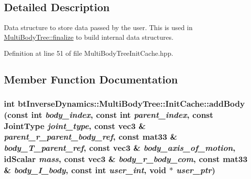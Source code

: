 \subsection{Detailed Description}
Data structure to store data passed by the user. This is used in \hyperlink{classbt_inverse_dynamics_1_1_multi_body_tree_c82772ed5bebb1edd6513c03ebd719c2}{MultiBodyTree::finalize} to build internal data structures. 

Definition at line 51 of file MultiBodyTreeInitCache.hpp.

\subsection{Member Function Documentation}
\hypertarget{classbt_inverse_dynamics_1_1_multi_body_tree_1_1_init_cache_3140b788b6cdc6c5a74cf2da2e8f5fac}{
\subsubsection[addBody]{\setlength{\rightskip}{0pt plus 5cm}int btInverseDynamics::MultiBodyTree::InitCache::addBody (const int {\em body\_\-index}, \/  const int {\em parent\_\-index}, \/  const JointType {\em joint\_\-type}, \/  const {\bf vec3} \& {\em parent\_\-r\_\-parent\_\-body\_\-ref}, \/  const mat33 \& {\em body\_\-T\_\-parent\_\-ref}, \/  const {\bf vec3} \& {\em body\_\-axis\_\-of\_\-motion}, \/  idScalar {\em mass}, \/  const {\bf vec3} \& {\em body\_\-r\_\-body\_\-com}, \/  const mat33 \& {\em body\_\-I\_\-body}, \/  const int {\em user\_\-int}, \/  void $\ast$ {\em user\_\-ptr})}}
\label{classbt_inverse_dynamics_1_1_multi_body_tree_1_1_init_cache_3140b788b6cdc6c5a74cf2da2e8f5fac}


